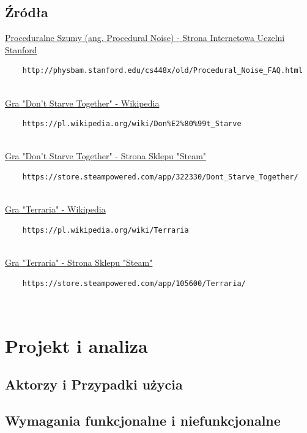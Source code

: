 \documentclass{article}
\begin{document}
\subsection{Źródła}
\href{http://physbam.stanford.edu/cs448x/old/Procedural_Noise_FAQ.html}{Proceduralne Szumy (ang. Procedural Noise) - Strona Internetowa Uczelni Stanford}
\begin{verbatim}
    http://physbam.stanford.edu/cs448x/old/Procedural_Noise_FAQ.html
\end{verbatim}\\
\href{https://pl.wikipedia.org/wiki/Don%E2%80%99t_Starve}{Gra "Don't Starve Together" - Wikipedia}\\
\begin{verbatim}
    https://pl.wikipedia.org/wiki/Don%E2%80%99t_Starve
\end{verbatim}\\
\href{https://store.steampowered.com/app/322330/Dont_Starve_Together/}{Gra "Don't Starve Together" - Strona Sklepu "Steam"}\\
\begin{verbatim}
    https://store.steampowered.com/app/322330/Dont_Starve_Together/
\end{verbatim}\\
\href{https://pl.wikipedia.org/wiki/Terraria}{Gra "Terraria" - Wikipedia}\\
\begin{verbatim}
    https://pl.wikipedia.org/wiki/Terraria
\end{verbatim}\\
\href{https://store.steampowered.com/app/105600/Terraria/}{Gra "Terraria" - Strona Sklepu "Steam"}\\
\begin{verbatim}
    https://store.steampowered.com/app/105600/Terraria/
\end{verbatim}\\
\newpage
\section{Projekt i analiza}
\subsection{Aktorzy i Przypadki użycia}
\subsection{Wymagania funkcjonalne i niefunkcjonalne}
\end{document}
